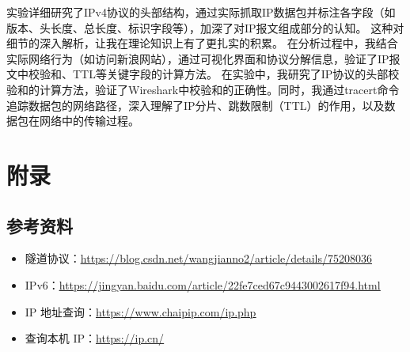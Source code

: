 \documentclass[14pt,a4paper,UTF8,twoside]{article}
\begin{document}
实验详细研究了IPv4协议的头部结构，通过实际抓取IP数据包并标注各字段（如版本、头长度、总长度、标识字段等），加深了对IP报文组成部分的认知。
这种对细节的深入解析，让我在理论知识上有了更扎实的积累。
在分析过程中，我结合实际网络行为（如访问新浪网站），通过可视化界面和协议分解信息，验证了IP报文中校验和、TTL等关键字段的计算方法。
在实验中，我研究了IP协议的头部校验和的计算方法，验证了Wireshark中校验和的正确性。同时，我通过tracert命令追踪数据包的网络路径，深入理解了IP分片、跳数限制（TTL）的作用，以及数据包在网络中的传输过程。

\section{附录}

\subsection*{参考资料}

\begin{itemize}
  \item 隧道协议：\href{https://blog.csdn.net/wangjianno2/article/details/75208036}{\underline{https://blog.csdn.net/wangjianno2/article/details/75208036}}
  \item IPv6：\href{https://jingyan.baidu.com/article/22fe7ced67c9443002617f94.html}{\underline{https://jingyan.baidu.com/article/22fe7ced67c9443002617f94.html}}
  \item IP 地址查询：\href{https://www.chaipip.com/ip.php}{\underline{https://www.chaipip.com/ip.php}}
  \item 查询本机 IP：\href{https://ip.cn/}{\underline{https://ip.cn/}}
\end{itemize}
\end{document}
